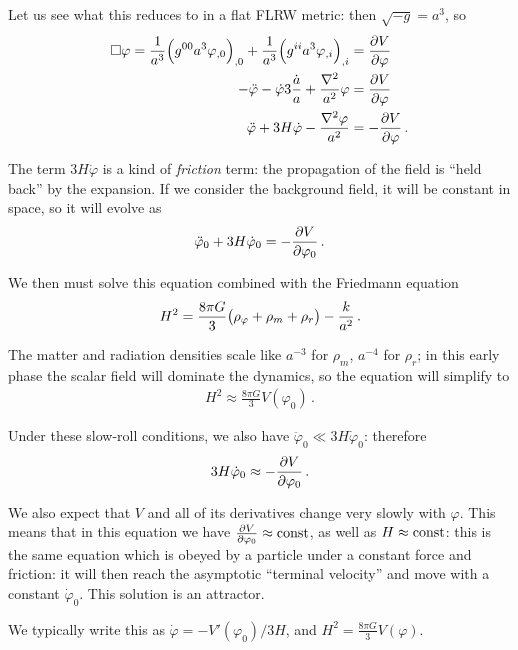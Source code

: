 \documentclass[main.tex]{subfiles}
\begin{document}
Let us see what this reduces to in a flat FLRW metric: then \(\sqrt{-g} = a^3\), so 
%
\begin{align}
\square \varphi = \frac{1}{a^3} \qty(g^{00} a^3\varphi_{, 0})_{, 0}
+ \frac{1}{a^3} \qty(g^{ii} a^3\varphi_{, i})_{, i} &= \pdv{V}{\varphi }  \\
- \ddot{\varphi} - \dot{\varphi} 3\frac{\dot{a}}{a}
+ \frac{\nabla^2}{a^2} \varphi 
&= \pdv{V}{ \varphi }  \\
\ddot{\varphi} + 3 H \dot{\varphi} - \frac{\nabla^2 \varphi }{a^2} &= - \pdv{V}{\varphi }
\,.
\end{align}

The term \(3 H \dot{\varphi}\) is a kind of \emph{friction} term: the propagation of the field is ``held back'' by the expansion. 
If we consider the background field, it will be constant in space, so it will evolve as 
%
\begin{align}
\ddot{\varphi}_0 + 3 H \dot{\varphi}_0 = - \pdv{V}{\varphi_0 }
\,.
\end{align}

We then must solve this equation combined with the Friedmann equation 
%
\begin{align}
H^2 = \frac{8 \pi G}{3} \qty(\rho _\varphi + \rho _m + \rho _r) - \frac{k}{a^2}
\,.
\end{align}

The matter and radiation densities scale like \(a^{-3}\) for \(\rho _m\), \(a^{-4}\) for \(\rho _r\); in this early phase the scalar field will dominate the dynamics, so the equation will simplify to 
%
\begin{align}
H^2 \approx \frac{8 \pi G}{3} V(\varphi_0 )
\,.
\end{align}

Under these slow-roll conditions, we also have \(\ddot{\varphi}_0 \ll 3 H \dot{\varphi}_0\): therefore 
%
\begin{align}
3 H \dot{\varphi}_{0} \approx - \pdv{V}{\varphi_0 }
\,.
\end{align}

We also expect that \(V\) and all of its derivatives change very slowly with \(\varphi \). 
This means that in this equation we have \(\pdv{V}{\varphi_0 } \approx \text{const}\), as well as \(H \approx \text{const}\): this is the same equation which is obeyed by a particle under a constant force and friction: it will then reach the asymptotic ``terminal velocity'' and move with a constant \(\dot{\varphi}_0 \). This solution is an attractor. 

We typically write this as \(\dot{\varphi} = - V' (\varphi_0 ) / 3H\), and \(H^2 = \frac{8 \pi G}{3} V(\varphi )\). 
\end{document}

